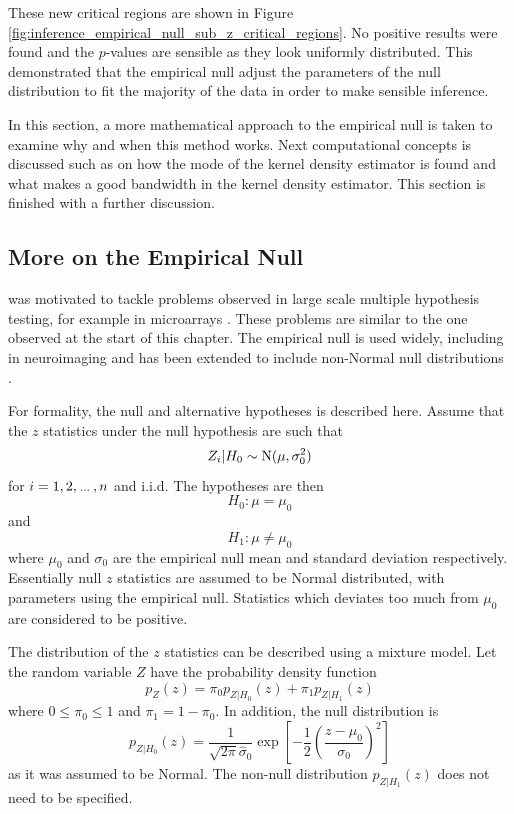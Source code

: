 These new critical regions are shown in Figure \ref{fig:inference_empirical_null_sub_z_critical_regions}. No positive results were found and the $p$-values are sensible as they look uniformly distributed. This demonstrated that the empirical null adjust the parameters of the null distribution to fit the majority of the data in order to make sensible inference.

In this section, a more mathematical approach to the empirical null is taken to examine why and when this method works. Next computational concepts is discussed such as on how the mode of the kernel density estimator is found and what makes a good bandwidth in the kernel density estimator. This section is finished with a further discussion.

\subsection{More on the Empirical Null}

\cite{efron2004large} was motivated to tackle problems observed in large scale multiple hypothesis testing, for example in microarrays \citep{hedenfalk2001gene, efron2002empirical, efron2003robbins}. These problems are similar to the one observed at the start of this chapter. The empirical null is used widely, including in neuroimaging \citep{schwartzman2008false, schwartzman2009empirical} and has been extended to include non-Normal null distributions \citep{schwartzman2008false, schwartzman2008empirical}.

For formality, the null and alternative hypotheses is described here. Assume that the $z$ statistics under the null hypothesis are such that
\begin{equation}
	Z_i|H_0\sim\operatorname{N}(\mu,\sigma_0^2)
\end{equation}
for $i=1,2,\dotdotdot,n$ and i.i.d. The hypotheses are then
\begin{equation}
	H_0:\mu = \mu_0
\end{equation}
and
\begin{equation}
	H_1:\mu\neq\mu_0
\end{equation}
where $\mu_0$ and $\sigma_0$ are the empirical null mean and standard deviation respectively. Essentially null $z$ statistics are assumed to be Normal distributed, with parameters using the empirical null. Statistics which deviates too much from $\mu_0$ are considered to be positive.

The distribution of the $z$ statistics can be described using a mixture model. Let the random variable $Z$ have the probability density function
\begin{equation}
	p_Z(z) =
	\pi_0 p_{Z|H_0}(z) + \pi_1 p_{Z|H_1}(z)
\end{equation}
where $0\leqslant\pi_0\leqslant 1$ and  $\pi_1 = 1-\pi_0$. In addition, the null distribution is
\begin{equation}
	p_{Z|H_0}(z) = 
	\dfrac{1}{\sqrt{2\pi}\widehat{\sigma}_0}
	\exp\left[
		-\dfrac{1}{2}
		\left(
			\dfrac{z-{\mu}_0}{{\sigma}_0}
		\right)^2
	\right]
\end{equation}
as it was assumed to be Normal. The non-null distribution $p_{Z|H_1}(z)$ does not need to be specified.

